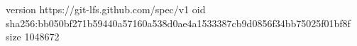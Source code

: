 version https://git-lfs.github.com/spec/v1
oid sha256:bb050bf271b59440a57160a538d0ae4a1533387cb9d0856f34bb75025f01bf8f
size 1048672
